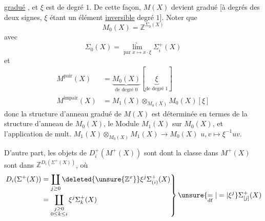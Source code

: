 \uline{gradué} , et $\xi$ est de degré $1$. De cette façon, $M(X)$ devient gradué [à degrés des deux signes, $\xi$ étant un élément \uline{inversible}  degré $1$]. Noter que
\[
M_0(X)=\mathbb Z^{\Sigma_0(X)}
\]
avec
\[
\Sigma_0(X)=\underset{\text{par }x\mapsto x\cdot\xi}{\underrightarrow{\lim}}\Sigma_i^+(X)
\]
et
\[
\begin{aligned}
M^{\mathrm{pair}}(X)&=\underbrace{M_0(X)}_{\text{de degré }0}[\underbrace{\xi}_{\text{de degré }1}]\\
M^{\mathrm{impair}}(X)&=M_1(X)\otimes_{M_0(X)}M_0(X)[\xi]
\end{aligned}
\]
donc la structure d'anneau gradué de $M(X)$ est déterminée en termes de la structure d'anneau de $M_0(X)$,  le Module $M_1(X)$ sur $M_0(X)$, et l'application de mult.
$M_1(X)\otimes_{M_{0}(X)}M_1(X)\longrightarrow M_0(X)$  \deleted{\unsure{$\xi$}} $u,v\mapsto\xi^{-1}uv$.

D'autre part, les objets de $D_i^+(M^+(X))$ sont   dont la classe dans  $M^+(X)$ sont dans $\mathbb Z^{D_i(\Sigma^+(X))}$, où
\[
\left.\begin{aligned}
D_i(\Sigma^+(X))&=\coprod_{j\geq0}\deleted{\unsure{\mathbb Z^{x}}}\xi^j\Sigma^+_{(i)}(X)\\
&=\coprod_{\substack{j\geq0\\0\leq k\leq i}}\xi^j\Sigma_k^+(X)
\end{aligned}\right\}\unsure{\underset{\mathrm{df}}{=}|\mathrel{=}|\xi^j}\Sigma^+_{[j]}(X)
\]
